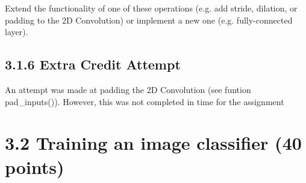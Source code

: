 \documentclass[11pt]{article}
\begin{document}
Extend the functionality of one of these operations (e.g. add stride,
dilation, or padding to the 2D Convolution) or implement a new one (e.g.
fully-connected layer).

\subsection{3.1.6 Extra Credit Attempt}\label{extra-credit-attempt}

An attempt was made at padding the 2D Convolution (see funtion
pad\_inputs()). However, this was not completed in time for the
assignment

    \section{3.2 Training an image classifier (40
points)}\label{training-an-image-classifier-40-points}
\end{document}
